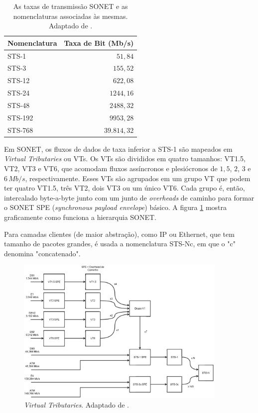\begin{table}
\centering
\begin{tabular}{|l|r|}
\hline
Nomenclatura & Taxa de Bit (Mb/s) \\\hline
STS-1 & $51,84$ \\
STS-3 & $155,52$ \\
STS-12 & $622,08$ \\
STS-24 & $1244,16$ \\
STS-48 & $2488,32$ \\
STS-192 & $9953,28$ \\
STS-768 & $39.814,32$ \\\hline
\end{tabular}
\caption{\label{tab:taxasSONET} As taxas de transmissão SONET e as nomenclaturas associadas às mesmas. Adaptado de \cite{Ramaswami2010}.}
\end{table}

Em SONET, os fluxos de dados de taxa inferior a STS-1 são mapeados em \textit{Virtual Tributaries} ou VTs. Os VTs são divididos em quatro tamanhos: VT1.5, VT2, VT3 e VT6, que acomodam fluxos assíncronos e plesiócronos de $1,5$, $2$, $3$ e $6 \, Mb/s$, respectivamente. Esses VTs são agrupados em um grupo VT que podem ter quatro VT1.5, três VT2, dois VT3 ou um único VT6. Cada grupo é, então, intercalado byte-a-byte junto com um junto de \textit{overheads} de caminho para formar o SONET SPE (\textit{synchronous payload envelope}) básico. A figura \ref{fig:vt} mostra graficamente como funciona a hierarquia SONET. 

Para camadas clientes (de maior abstração), como IP ou Ethernet, que tem tamanho de pacotes grandes, é usada a nomenclatura STS-Nc, em que o "c" denomina "concatenado". 

\begin{figure}
\centering
\includegraphics[width=0.9\textwidth]{image/vt.eps}
\caption{\label{fig:vt}\textit{Virtual Tributaries}. Adaptado de \cite{Ramaswami2010}.}
\end{figure}

